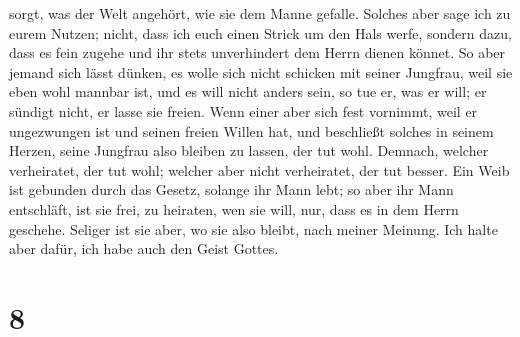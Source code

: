 sorgt, was der Welt angehört, wie sie dem Manne gefalle. 
Solches aber sage ich zu eurem Nutzen; nicht, dass ich euch einen Strick
um den Hals werfe, sondern dazu, dass es fein zugehe und ihr stets
unverhindert dem Herrn dienen könnet.  So aber jemand
sich lässt dünken, es wolle sich nicht schicken mit seiner Jungfrau,
weil sie eben wohl mannbar ist, und es will nicht anders sein, so tue
er, was er will; er sündigt nicht, er lasse sie freien. 
Wenn einer aber sich fest vornimmt, weil er ungezwungen ist und seinen
freien Willen hat, und beschließt solches in seinem Herzen, seine
Jungfrau also bleiben zu lassen, der tut wohl.  Demnach,
welcher verheiratet, der tut wohl; welcher aber nicht verheiratet, der
tut besser.  Ein Weib ist gebunden durch das Gesetz,
solange ihr Mann lebt; so aber ihr Mann entschläft, ist sie frei, zu
heiraten, wen sie will, nur, dass es in dem Herrn geschehe.
 Seliger ist sie aber, wo sie also bleibt, nach meiner
Meinung. Ich halte aber dafür, ich habe auch den Geist Gottes.

\hypertarget{section-7}{%
\section{8}\label{section-7}}

